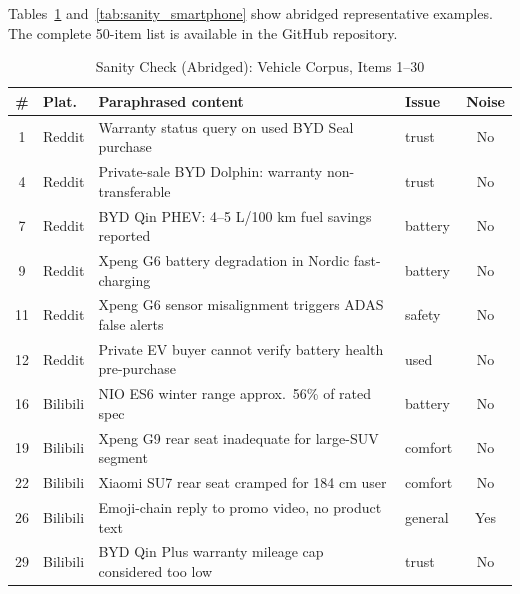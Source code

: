 \documentclass[conference]{IEEEtran}
\begin{document}
Tables~\ref{tab:sanity_vehicle} and~\ref{tab:sanity_smartphone} show abridged representative examples. The complete 50-item list is available in the GitHub repository.

\begin{table}[htb]
\caption{Sanity Check (Abridged): Vehicle Corpus, Items 1--30}
\label{tab:sanity_vehicle}
\centering\small\setlength{\tabcolsep}{3pt}
\begin{tabular}{clp{3.6cm}lc}
\toprule
\# & Plat. & Paraphrased content & Issue & Noise \\
\midrule
1  & Reddit  & Warranty status query on used BYD Seal purchase            & trust    & No \\
4  & Reddit  & Private-sale BYD Dolphin: warranty non-transferable         & trust    & No \\
7  & Reddit  & BYD Qin PHEV: 4--5 L/100 km fuel savings reported          & battery  & No \\
9  & Reddit  & Xpeng G6 battery degradation in Nordic fast-charging        & battery  & No \\
11 & Reddit  & Xpeng G6 sensor misalignment triggers ADAS false alerts     & safety   & No \\
12 & Reddit  & Private EV buyer cannot verify battery health pre-purchase  & used     & No \\
16 & Bilibili& NIO ES6 winter range approx.\ 56\% of rated spec           & battery  & No \\
19 & Bilibili& Xpeng G9 rear seat inadequate for large-SUV segment        & comfort  & No \\
22 & Bilibili& Xiaomi SU7 rear seat cramped for 184 cm user               & comfort  & No \\
26 & Bilibili& Emoji-chain reply to promo video, no product text          & general  & Yes \\
29 & Bilibili& BYD Qin Plus warranty mileage cap considered too low       & trust    & No \\
\bottomrule
\end{tabular}
\end{table}
\end{document}
